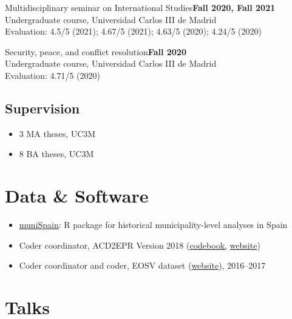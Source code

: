 \documentclass[a4paper, 12pt]{article}
\begin{document}
\noindent
Multidisciplinary seminar on International Studies\hfill\textbf{Fall 2020, Fall 2021}\\
{\small Undergraduate course, Universidad Carlos III de Madrid}\\
{\small Evaluation: 4.5/5 (2021); 4.67/5 (2021); 4.63/5 (2020); 4.24/5 (2020)}
\vspace{10pt}

\noindent
Security, peace, and conflict resolution\hfill\textbf{Fall 2020}\\
{\small Undergraduate course, Universidad Carlos III de Madrid}\\
{\small Evaluation: 4.71/5 (2020)}

\vspace{-10pt}
\subsection*{Supervision}

\begin{itemize}[leftmargin=*, nolistsep]
  \item 3 MA theses, UC3M
	\item 8 BA theses, UC3M
\end{itemize}

\section*{Data \& Software}

\begin{itemize}[leftmargin=*, nolistsep]
  \item \href{https://github.com/franvillamil/muniSpain}{muniSpain}: R package for historical municipality-level analyses in Spain
	\item Coder coordinator, ACD2EPR Version 2018 (\href{https://icr.ethz.ch/data/epr/acd2epr/ACD2EPR-2018_Codebook.pdf}{codebook,} \href{https://icr.ethz.ch/data/epr/acd2epr/}{website})
	\item Coder coordinator and coder, EOSV dataset (\href{https://snis.ch/project/civilian-victimization-conflict-escalation/}{website}), 2016--2017
\end{itemize}

\newpage
\section*{Talks}
\end{document}
